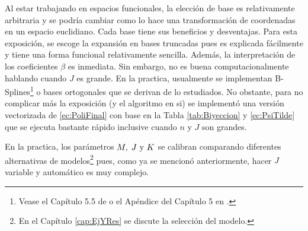 \documentclass[../Main/Main.tex]{subfiles}
\begin{document}

Al estar trabajando en espacios funcionales, la elección de base es relativamente arbitraria y se podría cambiar como lo hace una transformación de coordenadas en un espacio euclidiano. Cada base tiene sus beneficios y desventajas. Para esta exposición, se escoge la expansión en bases truncadas pues es explicada fácilmente y tiene una forma funcional relativamente sencilla. Además, la interpretación de los coeficientes $\beta$ es inmediata. Sin embargo, no es buena computacionalmente hablando cuando $J$ es grande. En la practica, usualmente se implementan B-Splines\footnote{Vease el Capítulo 5.5 de \citet{wasserman2007all} o el Apéndice del Capítulo 5 en \citet{hastie2008elements}.} o bases ortogonales que se derivan de lo estudiados. No obstante, para no complicar más la exposición (y el algoritmo en si) se implementó una versión vectorizada de \eqref{ec:PoliFinal} con base en la Tabla \ref{tab:Biyeccion} y \eqref{ec:PsiTilde} que se ejecuta bastante rápido inclusive cuando $n$ y $J$ son grandes.

En la practica, los parámetros $M,\;J\text{ y }K$ se calibran comparando diferentes alternativas de modelos\footnote{En el Capítulo \ref{cap:EjYRes} se discute la selección del modelo.} pues, como ya se mencionó anteriormente, hacer $J$ variable y automático es muy complejo. 
\end{document}
